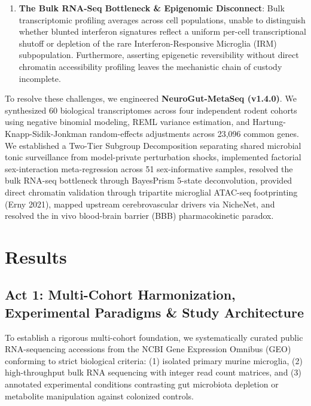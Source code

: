 \documentclass[10pt,a4paper]{article}
\begin{document}
\begin{enumerate}
\item \textbf{The Bulk RNA-Seq Bottleneck \& Epigenomic Disconnect}: Bulk transcriptomic profiling averages across cell populations, unable to distinguish whether blunted interferon signatures reflect a uniform per-cell transcriptional shutoff or depletion of the rare Interferon-Responsive Microglia (IRM) subpopulation. Furthermore, asserting epigenetic reversibility without direct chromatin accessibility profiling leaves the mechanistic chain of custody incomplete.
\end{enumerate}
To resolve these challenges, we engineered \textbf{NeuroGut-MetaSeq (v1.4.0)}. We synthesized 60 biological transcriptomes across four independent rodent cohorts using negative binomial modeling, REML variance estimation, and Hartung-Knapp-Sidik-Jonkman random-effects adjustments across 23,096 common genes. We established a Two-Tier Subgroup Decomposition separating shared microbial tonic surveillance from model-private perturbation shocks, implemented factorial sex-interaction meta-regression across 51 sex-informative samples, resolved the bulk RNA-seq bottleneck through BayesPrism 5-state deconvolution, provided direct chromatin validation through tripartite microglial ATAC-seq footprinting (Erny 2021), mapped upstream cerebrovascular drivers via NicheNet, and resolved the in vivo blood-brain barrier (BBB) pharmacokinetic paradox.



\vspace{1.5em}
\section{Results}
\subsection{Act 1: Multi-Cohort Harmonization, Experimental Paradigms \& Study Architecture}
To establish a rigorous multi-cohort foundation, we systematically curated public RNA-sequencing accessions from the NCBI Gene Expression Omnibus (GEO) conforming to strict biological criteria: (1) isolated primary murine microglia, (2) high-throughput bulk RNA sequencing with integer read count matrices, and (3) annotated experimental conditions contrasting gut microbiota depletion or metabolite manipulation against colonized controls. 
\end{document}
